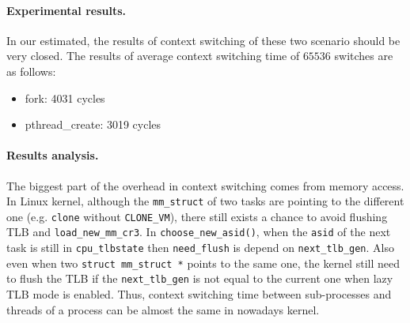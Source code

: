 \paragraph{Experimental results.}
In our estimated, the results of context switching of these two scenario should be very closed. The results of average context switching time of $65536$ switches are as follows:
\begin{itemize}[leftmargin=*]
	\item fork: 4031 cycles
	\item pthread\_create: 3019 cycles
\end{itemize}

\paragraph{Results analysis.} The biggest part of the overhead in context switching comes from memory access. In Linux kernel, although the \texttt{mm\_struct} of two tasks are pointing to the different one (e.g. \texttt{clone} without \texttt{CLONE\_VM}), there still exists a chance to avoid flushing TLB and \texttt{load\_new\_mm\_cr3}. In \texttt{choose\_new\_asid()}, when the \texttt{asid} of the next task is still in \texttt{cpu\_tlbstate} then \texttt{need\_flush} is depend on \texttt{next\_tlb\_gen}. Also even when two \texttt{struct mm\_struct *} points to the same one, the kernel still need to flush the TLB if the \texttt{next\_tlb\_gen} is not equal to the current one when lazy TLB mode is enabled. Thus, context switching time between sub-processes and threads of a process can be almost the same in nowadays kernel.
